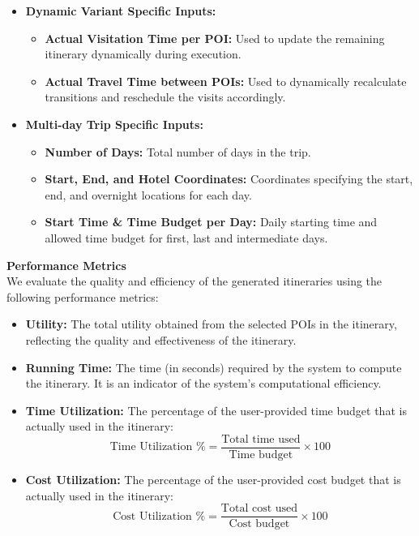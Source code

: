 {\begin{itemize}
    \item \textbf{Dynamic Variant Specific Inputs:}
    \begin{itemize}
        \item \textbf{Actual Visitation Time per POI:} Used to update the remaining itinerary dynamically during execution.
        \item \textbf{Actual Travel Time between POIs:} Used to dynamically recalculate transitions and reschedule the visits accordingly.
    \end{itemize}
    
    \item \textbf{Multi-day Trip Specific Inputs:}
    \begin{itemize}
        \item \textbf{Number of Days:} Total number of days in the trip.
        \item \textbf{Start, End, and Hotel Coordinates:} Coordinates specifying the start, end, and overnight locations for each day.
        \item \textbf{Start Time \& Time Budget per Day:} Daily starting time and allowed time budget for first, last and intermediate days.
    \end{itemize}
\end{itemize}

\noindent\textbf{Performance Metrics}\\
We evaluate the quality and efficiency of the generated itineraries using the following performance metrics:

\begin{itemize}
    \item \textbf{Utility:} The total utility obtained from the selected POIs in the itinerary, reflecting the quality and effectiveness of the itinerary.
    
    \item \textbf{Running Time:} The time (in seconds) required by the system to compute the itinerary. It is an indicator of the system's computational efficiency.

    \item \textbf{Time Utilization:} The percentage of the user-provided time budget that is actually used in the itinerary:
    \[
    \text{Time Utilization \%} = \frac{\text{Total time used}}{\text{Time budget}} \times 100
    \]

     \item \textbf{Cost Utilization:} The percentage of the user-provided cost budget that is actually used in the itinerary:
    \[
    \text{Cost Utilization \%} = \frac{\text{Total cost used}}{\text{Cost budget}} \times 100
    \]
    

\end{itemize}}
